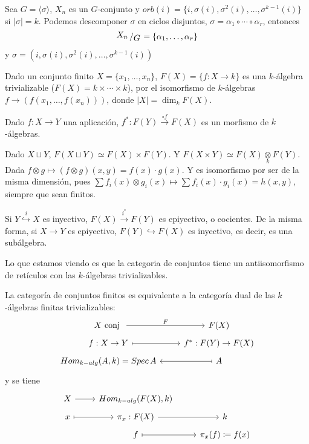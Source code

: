 \begin{ejer}
Sea $ G = \langle \sigma \rangle$, $X_n$ es un $G$-conjunto y $orb(i) = \{i, \sigma(i), \sigma^2(i), \ldots, \sigma^{k-1}(i)\}$ si $|\sigma|=k$. Podemos descomponer $\sigma$ en ciclos disjuntos, $\sigma = \alpha_1\circ \cdots \circ \alpha_r$, entonces
$$\modulo{X_n}{G} = \{ \alpha_1, \ldots, \alpha_r \}$$
y $\sigma = (i, \sigma(i), \sigma^2(i), \ldots, \sigma^{k-1}(i))$
\end{ejer}
\begin{ejem}
Dado un conjunto finito $X = \{x_1, \ldots, x_n\}$, $F(X) = \{f: X \to k\}$ es una $k$-\'algebra trivializable ($F(X) = k\times \cdots \times k$), por el isomorfismo de $k$-\'algebras $f \to (f(x_1, \ldots, f(x_n)))$, donde $|X| = \dim_k F(X)$. 

Dado $f:X \to Y$ una aplicaci\'on, $f^*: F(Y) \overset{\circ f}{\longrightarrow} F(X)$ es un morfismo de $k$-\'algebras.

Dado $X \sqcup Y$, $F(X \sqcup Y) \simeq F(X) \times F(Y)$. Y $F(X\times Y) \simeq F(X) \underset{k}{\otimes}F(Y)$. Dada $f \otimes g \longmapsto  (f\otimes g)(x,y) = f(x) \cdot g(x)$. Y es isomorfismo por ser de la misma dimensi\'on, pues $\sum f_i(x) \otimes g_i(x) \longmapsto \sum f_i(x)\cdot g_i(x) = h(x,y)$, siempre que sean finitos. 

Si $Y \overset{i}{\hookrightarrow} X$ es inyectivo, $F(X) \overset{i^*}{\longrightarrow} F(Y)$ es epiyectivo, o cocientes. De la misma forma, si $X \longrightarrow Y$ es epiyectivo, $F(Y) \hookrightarrow F(X)$ es inyectivo, es decir, es una sub\'algebra.

Lo que estamos viendo es que la categoria de conjuntos tiene un antiisomorfismo de ret\'iculos con las $k$-\'algebras trivializables.
\end{ejem}
\begin{teo}
    La categor\'ia de conjuntos finitos es equivalente a la categor\'ia dual de las $k$-\'algebras finitas trivializables:
    $$\bt X \text{ conj } \rar{F} & F(X) \\[-5mm] f:X\to Y \rarmaps & f^* :F(Y) \to F(X) \\[-5mm] Hom_{k-alg}(A, k) = Spec\, A & \arrow[mapsto]{l} A \et$$
    y se tiene 
    $$\bt X \rar & Hom_{k-alg}(F(X),k) \\[-5mm] x \rarmaps & \pi_x : F(X) \rar & k \\[-5mm] & f \rarmaps &  \pi_x(f) \coloneq f(x)  \et$$
\end{teo}
